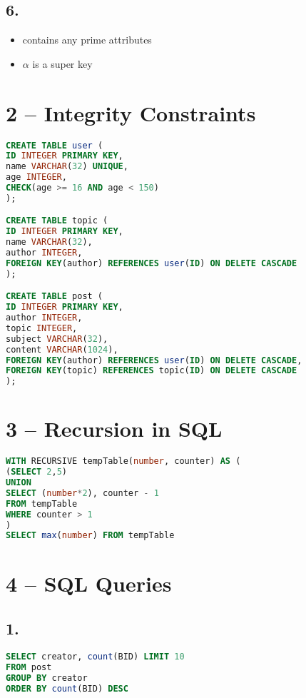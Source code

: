 \documentclass[10pt,a4paper,final]{report}
\begin{document}
\subsection*{6.}
\begin{itemize}
     \item contains any prime attributes
     \item $\alpha$ is a super key
\end{itemize}

\section*{2 -- Integrity Constraints}
\begin{lstlisting}[language=SQL]
CREATE TABLE user (
ID INTEGER PRIMARY KEY,
name VARCHAR(32) UNIQUE,
age INTEGER,
CHECK(age >= 16 AND age < 150)
);

CREATE TABLE topic (
ID INTEGER PRIMARY KEY,
name VARCHAR(32),
author INTEGER,
FOREIGN KEY(author) REFERENCES user(ID) ON DELETE CASCADE
);

CREATE TABLE post (
ID INTEGER PRIMARY KEY,
author INTEGER,
topic INTEGER,
subject VARCHAR(32),
content VARCHAR(1024),
FOREIGN KEY(author) REFERENCES user(ID) ON DELETE CASCADE,
FOREIGN KEY(topic) REFERENCES topic(ID) ON DELETE CASCADE
);
\end{lstlisting}

\section*{3 -- Recursion in SQL}
\begin{lstlisting}[language=SQL]
WITH RECURSIVE tempTable(number, counter) AS (
(SELECT 2,5)
UNION
SELECT (number*2), counter - 1
FROM tempTable
WHERE counter > 1
)
SELECT max(number) FROM tempTable
\end{lstlisting}

\section{4 -- SQL Queries}

\subsection*{1.}
\begin{lstlisting}[language=SQL]
SELECT creator, count(BID) LIMIT 10
FROM post 
GROUP BY creator
ORDER BY count(BID) DESC
\end{lstlisting}
\end{document}

